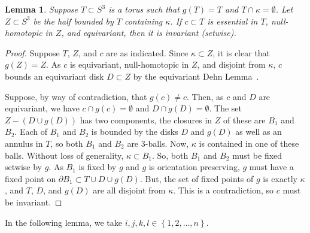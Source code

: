 \documentclass{amsart}
\numberwithin{equation}{section}
\newtheorem{lemma}[theorem]{Lemma}
\theoremstyle{definition}
\newcommand{\cpa}[1]{\left\{#1\right\}}
\begin{document}
\begin{lemma}\label{lem:torus}
Suppose $T\subset S^3$ is a torus such that $g(T)=T$ and $T\cap\kappa=\emptyset$.
Let $Z\subset S^3$ be the half bounded by $T$ containing $\kappa$.
If $c\subset T$ is essential in $T$, null-homotopic in $Z$, and equivariant, then it is invariant (setwise).
\end{lemma}
\begin{proof}
Suppose $T$, $Z$, and $c$ are as indicated.
Since $\kappa\subset Z$, it is clear that $g(Z)=Z$.
As $c$ is equivariant, null-homotopic in $Z$, and disjoint from $\kappa$, $c$ bounds an equivariant disk $D\subset Z$ by the equivariant Dehn Lemma~\cite{Edm86}.

Suppose, by way of contradiction, that $g(c)\neq c$.
Then, as $c$ and $D$ are equivariant, we have $c\cap g(c)=\emptyset$ and $D\cap g(D)=\emptyset$.
The set $Z-(D\cup g(D))$ has two components, the closures in $Z$ of these are $B_1$ and $B_2$.
Each of $B_1$ and $B_2$ is bounded by the disks $D$ and $g(D)$ as well as an annulus in $T$, so both $B_1$ and $B_2$ are 3-balls.
Now, $\kappa$ is contained in one of these balls.
Without loss of generality, $\kappa\subset B_1$.
So, both $B_1$ and $B_2$ must be fixed setwise by $g$.
As $B_1$ is fixed by $g$ and $g$ is orientation preserving, $g$ must have a fixed point on $\partial B_1\subset T\cup D\cup g(D)$.
But, the set of fixed points of $g$ is exactly $\kappa$, and $T$, $D$, and $g(D)$ are all disjoint from $\kappa$.
This is a contradiction, so $c$ must be invariant.
\end{proof}

In the following lemma, we take $i,j,k,l\in\cpa{1,2,\ldots,n}$.
\end{document}
